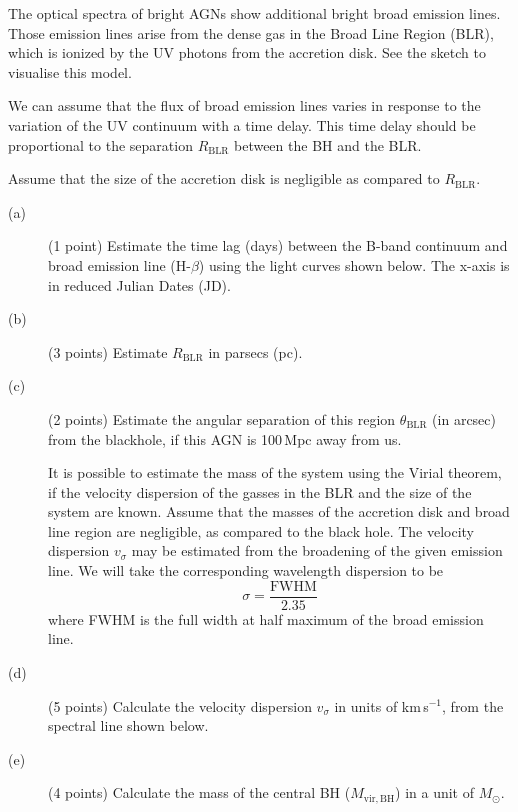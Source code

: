 The optical spectra of bright AGNs show additional bright broad emission
lines. Those emission lines arise from the dense gas in the Broad Line Region
(BLR), which is ionized by the UV photons from the accretion disk. See the
sketch to visualise this model.


We can assume that the flux of broad emission lines varies in response to the
variation of the UV continuum with a time delay. This time delay should be
proportional to the separation $R_{\mathrm{BLR}}$ between the BH and the BLR.

Assume that the size of the accretion disk is negligible as compared to
$R_{\mathrm{BLR}}$.

\begin{description}
\item[(a)] (1 point) Estimate the time lag (days) between the B-band continuum
  and broad emission line (H-$\beta$) using the light curves shown below. The
  x-axis is in reduced Julian Dates (JD).

\item[(b)] (3 points) Estimate $R_{\mathrm{BLR}}$ in parsecs (pc).
\item[(c)] (2 points) Estimate the angular separation of this region
  $\theta_{\mathrm{BLR}}$ (in arcsec) from the blackhole, if this AGN is
  100\,Mpc away from us.

  It is possible to estimate the mass of the system using the Virial theorem,
  if the velocity dispersion of the gasses in the BLR and the size of the
  system are known. Assume that the masses of the accretion disk and broad
  line region are negligible, as compared to the black hole. The velocity
  dispersion $v_\sigma$ may be estimated from the broadening of the given
  emission line. We will take the corresponding wavelength dispersion to be
  \[ \sigma = \frac{\mathrm{FWHM}}{2.35} \]
  where FWHM is the full width at half maximum of the broad emission line.
\item[(d)] (5 points) Calculate the velocity dispersion $v_\sigma$ in units of
  km\,s$^{-1}$, from the spectral line shown below.

\item[(e)] (4 points) Calculate the mass of the central BH
  ($M_{\mathrm{vir,BH}}$) in a unit of $M_\odot$.
\end{description}

